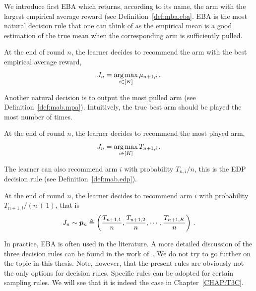 We introduce first EBA which returns, according to its name, the arm with the largest empirical average reward (see Definition~\ref{def:mba.eba}. EBA is the most natural decision rule that one can think of as the empirical mean is a good estimation of the true mean when the corresponding arm is sufficiently pulled.

\begin{definition}
\begin{leftbar}[defnbar]\label{def:mba.eba}
    At the end of round $n$, the learner decides to recommend the arm with the best empirical average reward,
    \[
        J_n = \operatorname*{arg\,max}_{i\in[K]} \mu_{n+1,i}\,.
    \]
\end{leftbar}
\end{definition}

Another natural decision is to output the most pulled arm (see Definition~\ref{def:mab.mpa}). Intuitively, the true best arm should be played the most number of times.

\begin{definition}
\begin{leftbar}[defnbar]\label{def:mab.mpa}
    At the end of round $n$, the learner decides to recommend the most played arm,
    \[
        J_n = \operatorname*{arg\,max}_{i\in[K]} T_{n+1,i}\,.
    \]
\end{leftbar}
\end{definition}

The learner can also recommend arm $i$ with probability $T_{n,i}/n$, this is the EDP decision rule (see Definition~\ref{def:mab.edp}).

\begin{definition}
\begin{leftbar}[defnbar]\label{def:mab.edp}
    At the end of round $n$, the learner decides to recommend arm $i$ with probability $T_{n+1,i}/(n+1)$, that is
    \[
        J_n \sim \boldsymbol{p}_{n}\triangleq\left(\frac{T_{n+1,1}}{n},\frac{T_{n+1,2}}{n},\cdots,\frac{T_{n+1,K}}{n}\right)\,.
    \]
\end{leftbar}
\end{definition}

In practice, EBA is often used in the literature. A more detailed discussion of the three decision rules can be found in the work of~\cite{bubeck2009pure}. We do not try to go further on the topic in this thesis. Note, however, that the present rules are obviously not the only options for decision rules. Specific rules can be adopted for certain sampling rules. We will see that it is indeed the case in Chapter~\ref{CHAP:T3C}.

